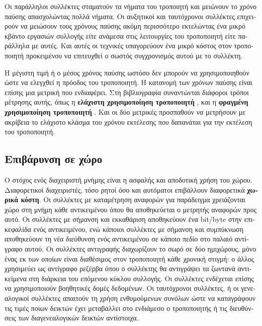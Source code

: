 \begin{greek}
Οι παράλληλοι συλλέκτες σταματούν τα νήματα του τροποιητή και
μειώνουν το χρόνο παύσης απασχολώντας πολλά νήματα. Οι αυξητικοί
και ταυτόχρονοι συλλέκτες επιχειρούν να μειώσουν τους χρόνους
παύσης ακόμη περισσότερο εκτελώντας ένα μικρό κβάντο εργασιών
συλλογής είτε ανάμεσα στις λειτουργίες του τροποποιητή είτε
παράλληλα με αυτές. Και αυτές οι τεχνικές υπαγορεύουν ένα μικρό
κόστος στον τροποποιητή προκειμένου να επιτευχθεί ο σωστός συγχρονισμός 
αυτού με το συλλέκτη.

Η μέγιστη τιμή ή ο μέσος χρόνος παύσης ωστόσο δεν μπορούν να
χρησιμοποιηθούν ώστε να ελεγχθεί η πρόοδος του τροποποιητή. Η
κατανομή των χρόνων παύσης είναι επίσης μια μετρική που ενδιαφέρει.
Στη βιβλιογραφία συναντώνται διάφοροι τρόποι μέτρησης αυτής,
όπως η \textbf{ελάχιστη χρησιμοποίηση τροποποιητή} \cite{DBLP:conf/pldi/ChengB01},
και η \textbf{φραγμένη χρησιμοποίηση τροποποιητή} \cite{DBLP:conf/oopsla/SachindranMB04}.
Και οι δύο μετρικές προσπαθούν να μετρήσουν με ακρίβεια το
ελάχιστο κλάσμα του χρόνου εκτέλεσης που δαπανάται για την
εκτέλεση του τροποποιητή.

\subsection{Επιβάρυνση σε χώρο}
Ο στόχος ενός διαχειριστή μνήμης είναι η ασφαλής και αποδοτική
χρήση του χώρου. Διαφορετικοί διαχειριστές, τόσο ρητοί όσο και
αυτόματοι επιβάλλουν διαφορετικά \textbf{χωρικά κόστη}. Οι συλλέκτες
με καταμέτρηση αναφορών για παράδειγμα χρειάζονται χώρο στη
μνήμη κάθε αντικειμένου όπου θα αποθηκεύεται ο μετρητής αναφορών
προς αυτό. Οι συλλέκτες με σήμανση και εκκαθάριση αποθηκεύουν
ένα bit/byte στην επικεφαλίδα ενός αντικειμένου, ενώ κάποιοι
συλλέκτες με σήμανση και συμπύκνωση αποθηκεύουν τη νέα διεύθυνση
ενός αντικειμένου σε κάποιο πεδίο στο παλαιό αντίγραφο αυτού.
Οι συλλέκτες αντιγραφής διαχωρίζουν το σωρό σε δύο ημιχώρους,
μόνο ένας εκ των οποίων είναι διαθέσιμος στον τροποποιητή κάθε
χρονική στιγμή: ο άλλος χρησιμεύει ως αντίγραφο ρεζέρβα όπου
ο συλλέκτης θα αντιγράψει τα ζωντανά αντικείμενα στη διάρκεια
του επόμενου κύκλου συλλογής. Οι συλλέκτες ενδέχεται επίσης να
χρησιμοποιούν βοηθητικές δομές δεδομένων. Οι ταυτόχρονοι συλλέκτες,
ή οι γενεαλογικοί συλλέκτες απαιτούν τη χρήση ενθυμούμενων συνόλων
ώστε να καταγράφουν τις τιμές ποιων δεικτών έχει μεταβάλλει στο
ενδιάμεσο ο τροποποιητής ή τις διευθύνσεις των διαγενεαλογικών
δεικτών αντίστοιχα.


\end{greek}
